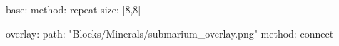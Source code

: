 base:
  method: repeat
  size: [8,8]

overlay:
  path: "Blocks/Minerals/submarium_overlay.png"
  method: connect
